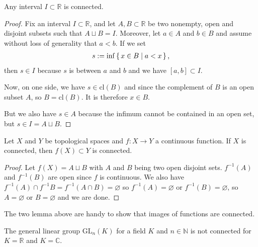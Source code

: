 \begin{thmbox}
    \begin{lemma}
        Any {\color{mathif}interval} \(I \subset \mathbb{R}\) is {\color{maththen}connected}.
    \end{lemma}
\end{thmbox}
%
\begin{proof}
    Fix an interval \(I \subset \mathbb{R}\), and let \(A, B \subset \mathbb{R}\) be two nonempty, open and disjoint subsets such that \(A \sqcup B = I\). Moreover, let \(a \in A\) and \(b \in B\) and assume without loss of generality that \(a < b\). If we set
    \begin{align}
        s := \inf \left\{\, x \in B \mid a < x \,\right\} \text{,}
    \end{align}
    then \(s \in I\) because \(s\) is between \(a\) and \(b\) and we have \([a, b] \subset I\).

    Now, on one side, we have \(s \in \mathrm{cl}(B)\) and since the complement of \(B\) is an open subset \(A\), so \(B = \mathrm{cl}(B)\). It is therefore \(x \in B\).
    
    But we also have \(s \in A\) because the infimum cannot be contained in an open set, but \(s \in I = A \sqcup B\).
\end{proof}
%
\begin{thmbox}
    \begin{lemma}
        Let \(X\) and \(Y\) be {\color{mathif}topological spaces} and \(f: X \longrightarrow Y\) a {\color{mathif}continuous function}. If \(X\) is {\color{mathif}connected}, then \(f(X) \subset Y\) is {\color{maththen}connected}.
    \end{lemma}
\end{thmbox}
%
\begin{proof}
    Let \(f(X) = A \sqcup B\) with \(A\) and \(B\) being two open disjoint sets. \(f^{-1}(A)\) and \(f^{-1}(B)\) are open since \(f\) is continuous. We also have \(f^{-1}(A) \cap f^{-1}B = f^{-1}(A \cap B) = \varnothing\) so \(f^{-1}(A) = \varnothing\) or \(f^{-1}(B) = \varnothing\), so \(A = \varnothing\) or \(B = \varnothing\) and we are done.
\end{proof}
%
\begin{rembox}
    \begin{remark}
        The two lemma above are handy to show that images of functions are connected.
    \end{remark}
\end{rembox}
%
\begin{example}
    The general linear group \(\mathrm{GL}_n(K)\) for a field \(K\) and \(n \in \mathbb{N}\) is not connected for \(K = \mathbb{R}\) and \(K = \mathbb{C}\).
\end{example}

